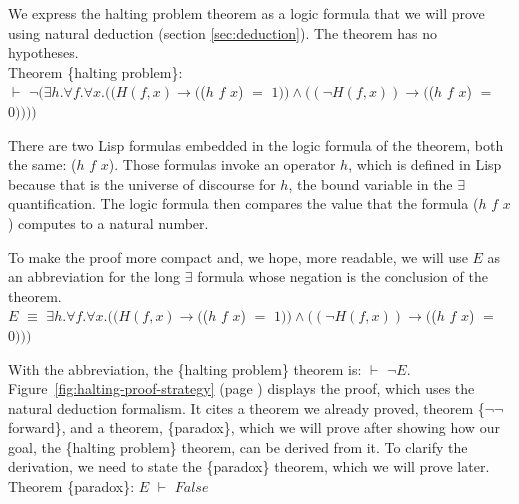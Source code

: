 We express the halting problem
theorem as a logic formula that we will prove
using natural deduction (section \ref{sec:deduction}).
The theorem has no hypotheses.
\vspace{2mm}\\
\hspace*{5mm}Theorem \{halting problem\}:\\
\hspace*{1cm}$\vdash$ $\neg(\exists h. \forall f. \forall x.
((H(f, x) \rightarrow ($\textsf{($h$ $f$ $x$)} $=$ $1)) \wedge ((\neg H(f, x)) \rightarrow ($\textsf{($h$ $f$ $x$)} $=$ $0))))$
\vspace{2mm}

There are two Lisp formulas embedded in
the logic formula of the theorem, both the same:
\textsf{($h$ $f$ $x$)}.
Those formulas invoke an operator $h$, which is defined in Lisp because that is the universe
of discourse for $h$, the bound variable in the $\exists$ quantification.
The logic formula then compares the value that
the formula \textsf{($h$ $f$ $x$)} computes to a natural number.

To make the proof more compact and, we hope, more readable,
we will use $E$ as an abbreviation for the
long $\exists$ formula whose negation is the conclusion of the theorem.
\vspace{2mm}\\
\hspace*{5mm}$E$ $\equiv$ $\exists h. \forall f. \forall x.
((H(f, x) \rightarrow ($\textsf{($h$ $f$ $x$)} $=$ $1)) \wedge ((\neg H(f, x)) \rightarrow ($\textsf{($h$ $f$ $x$)} $=$ $0)))$
\vspace{2mm}

With the abbreviation, the \{halting problem\} theorem is: $\vdash$ $\neg E$.
Figure~\ref{fig:halting-proof-strategy} (page \pageref{fig:halting-proof-strategy})
displays the proof, which uses the natural deduction formalism.
It cites a theorem we already proved, theorem \{$\neg \neg$ forward\}, and
a theorem, \{paradox\}, which we will prove
after showing how our goal, the \{halting problem\} theorem,
can be derived from it.
To clarify the derivation, we need to state the \{paradox\} theorem,
which we will prove later.
\vspace{2mm}\\
\hspace*{5mm}Theorem \{paradox\}: $E$ $\vdash$ $False$
\vspace{2mm}


